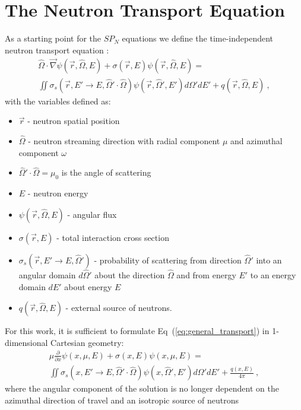 \section{The Neutron Transport Equation}
\label{sec:transport_eq}
As a starting point for the $SP_N$ equations we define the
time-independent neutron transport equation
\cite{lewis_computational_1993}:
\begin{multline}
  \hat{\Omega} \cdot \vec{\nabla} \psi(\vec{r},\hat{\Omega},E) +
  \sigma(\vec{r},E) \psi(\vec{r},\hat{\Omega},E) = \\ \iint
  \sigma_s(\vec{r},E' \rightarrow E,\hat{\Omega}' \cdot \hat{\Omega})
  \psi(\vec{r},\hat{\Omega}',E') d\Omega' dE' +
  q(\vec{r},\hat{\Omega},E)\:,
  \label{eq:general_transport}
\end{multline}
with the variables defined as:
\begin{itemize}
\item $\vec{r}$ - neutron spatial position
\item $\hat{\Omega}$ - neutron streaming direction with radial
  component $\mu$ and azimuthal component $\omega$
\item $\hat{\Omega}' \cdot \hat{\Omega} = \mu_0$ is the angle of
  scattering
\item $E$ - neutron energy
\item $\psi(\vec{r},\hat{\Omega},E)$ - angular flux
\item $\sigma(\vec{r},E)$ - total interaction cross section
\item $\sigma_s(\vec{r},E' \rightarrow E,\hat{\Omega}')$ - probability
  of scattering from direction $\hat{\Omega}'$ into an angular domain
  $d\hat{\Omega}'$ about the direction $\hat{\Omega}$ and from energy
  $E'$ to an energy domain $dE'$ about energy $E$
\item $q(\vec{r},\hat{\Omega},E)$ - external source of neutrons.
\end{itemize}
For this work, it is sufficient to formulate
Eq~(\ref{eq:general_transport}) in 1-dimensional Cartesian geometry:
\begin{multline}
  \mu \frac{\partial}{\partial x} \psi(x,\mu,E) + \sigma(x,E)
  \psi(x,\mu,E) = \\ \iint \sigma_s(x,E' \rightarrow E,\hat{\Omega}'
  \cdot \hat{\Omega}) \psi(x,\hat{\Omega}',E') d\Omega' dE' +
  \frac{q(x,E)}{4 \pi}\:,
  \label{eq:cart_1d_transport}
\end{multline}
where the angular component of the solution is no longer dependent on
the azimuthal direction of travel and an isotropic source of neutrons
